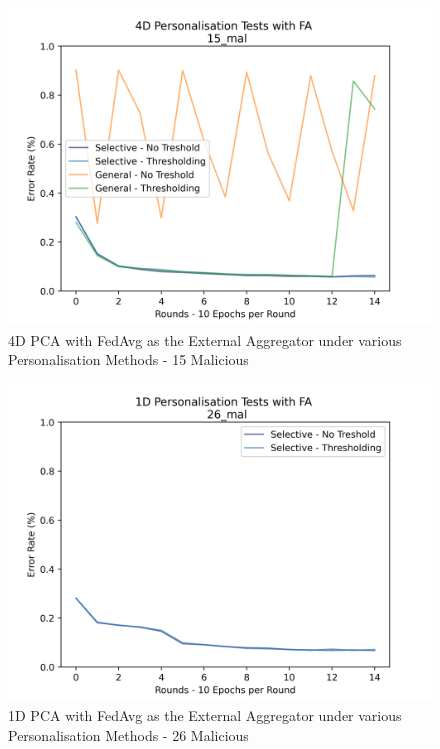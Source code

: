 \begin{figure}[htbp]
	\centering
    \includegraphics[scale=0.5]{my_agg/graphs/fa_4d_15mal.png}
	\caption{4D PCA with FedAvg as the External Aggregator under various Personalisation Methods - 15 Malicious}
	\label{fig:4d_15mal}
\end{figure}

\begin{figure}[htbp]
	\centering
    \includegraphics[scale=0.5]{my_agg/graphs/fa_1d_26mal.png}
	\caption{1D PCA with FedAvg as the External Aggregator under various Personalisation Methods - 26 Malicious}
	\label{fig:1d_26mal}
\end{figure}


